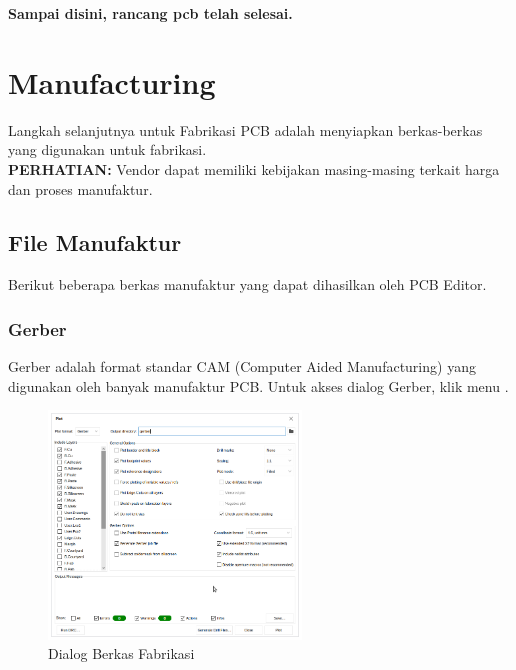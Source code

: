 \documentclass[12pt]{book}
\begin{document}
	\begin{center}
		\textbf{Sampai disini, rancang pcb telah selesai.}
	\end{center}


	\newpage
	\chapter{Manufacturing}

	Langkah selanjutnya untuk Fabrikasi PCB adalah menyiapkan berkas-berkas yang digunakan untuk fabrikasi.\\

	\textbf{PERHATIAN:} Vendor dapat memiliki kebijakan masing-masing terkait harga dan proses manufaktur.

	\section{File Manufaktur}

	Berikut beberapa berkas manufaktur yang dapat dihasilkan oleh PCB Editor.

	\subsection{Gerber}

	Gerber adalah format standar CAM (Computer Aided Manufacturing) yang digunakan oleh banyak manufaktur PCB.
	Untuk akses dialog Gerber, klik menu .

	\begin{figure}[!ht]
		\centering
		\includegraphics[width=0.6\textwidth]{images/fab/fab_0}
		\caption{Dialog Berkas Fabrikasi}
	\end{figure}
\end{document}
